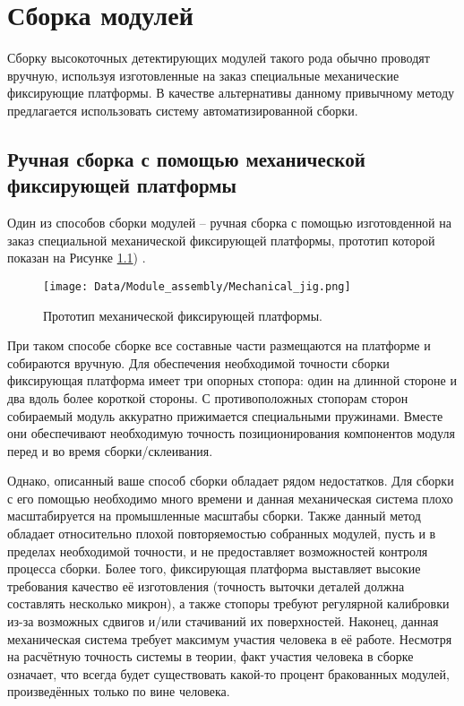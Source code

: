 \chapter{Сборка модулей}

Сборку высокоточных детектирующих модулей такого рода обычно проводят вручную, используя изготовленные на заказ специальные механические фиксирующие платформы. В качестве альтернативы данному привычному методу предлагается использовать систему автоматизированной сборки.

\section{Ручная сборка с помощью механической фиксирующей платформы}

Один из способов сборки модулей -- ручная сборка с помощью изготовденной на заказ специальной механической фиксирующей платформы, прототип которой показан на Рисунке \ref{fig:mechanical_jig}) \cite{Automated_assembly_slides}.

\begin{figure}[ht]\centering
\texttt{[image: Data/Module\_assembly/Mechanical\_jig.png]}
\caption{Прототип механической фиксирующей платформы.}
\label{fig:mechanical_jig}
\end{figure}

При таком способе сборке все составные части размещаются на платформе и собираются вручную. Для обеспечения необходимой точности сборки фиксирующая платформа имеет три опорных стопора: один на длинной стороне и два вдоль более короткой стороны. С противоположных стопорам сторон собираемый модуль аккуратно прижимается специальными пружинами. Вместе они обеспечивают необходимую точность позиционирования компонентов модуля перед и во время сборки/склеивания.

Однако, описанный ваше способ сборки обладает рядом недостатков. Для сборки с его помощью необходимо много времени и данная механическая система плохо масштабируется на промышленные масштабы сборки. Также данный метод обладает относительно плохой повторяемостью собранных модулей, пусть и в пределах необходимой точности, и не предоставляет возможностей контроля процесса сборки. Более того, фиксирующая платформа выставляет высокие требования качество её изготовления (точность выточки деталей должна составлять несколько микрон), а также стопоры требуют регулярной калибровки из-за возможных сдвигов и/или стачиваний их поверхностей. Наконец, данная механическая система требует максимум участия человека в её работе. Несмотря на расчётную точность системы в теории, факт участия человека в сборке означает, что всегда будет существовать какой-то процент бракованных модулей, произведённых только по вине человека.

